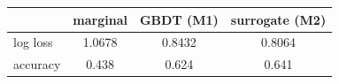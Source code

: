 \begin{tabular}{lccc}
\toprule
 & marginal & GBDT (M1) & surrogate (M2) \\
\midrule
log loss & 1.0678 & 0.8432 & 0.8064 \\
accuracy & 0.438 & 0.624 & 0.641 \\
\bottomrule
\end{tabular}
